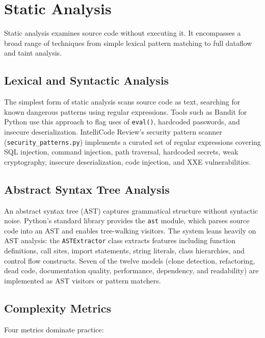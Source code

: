 \documentclass[12pt, oneside]{report}
\begin{document}
\section{Static Analysis}
\label{sec:bg-static}

Static analysis examines source code without executing it. It encompasses a broad range
of techniques from simple lexical pattern matching to full dataflow and taint analysis.

\subsection{Lexical and Syntactic Analysis}

The simplest form of static analysis scans source code as text, searching for known
dangerous patterns using regular expressions. Tools such as Bandit for Python use this
approach to flag uses of \texttt{eval()}, hardcoded passwords, and insecure deserialization.
IntelliCode Review's security pattern scanner (\texttt{security\_patterns.py}) implements
a curated set of regular expressions covering SQL injection, command injection, path
traversal, hardcoded secrets, weak cryptography, insecure deserialization, code injection,
and XXE vulnerabilities.

\subsection{Abstract Syntax Tree Analysis}

An abstract syntax tree (AST) captures grammatical structure without syntactic noise.
Python's standard library provides the
\texttt{ast} module, which parses source code into an AST and enables tree-walking
visitors. The system leans heavily on AST analysis: the \texttt{ASTExtractor}
class extracts features including function definitions, call sites, import statements,
string literals, class hierarchies, and control flow constructs. Seven of the twelve
models (clone detection, refactoring, dead code, documentation quality, performance,
dependency, and readability) are implemented as AST visitors or pattern matchers.

\subsection{Complexity Metrics}

Four metrics dominate practice:
\end{document}
